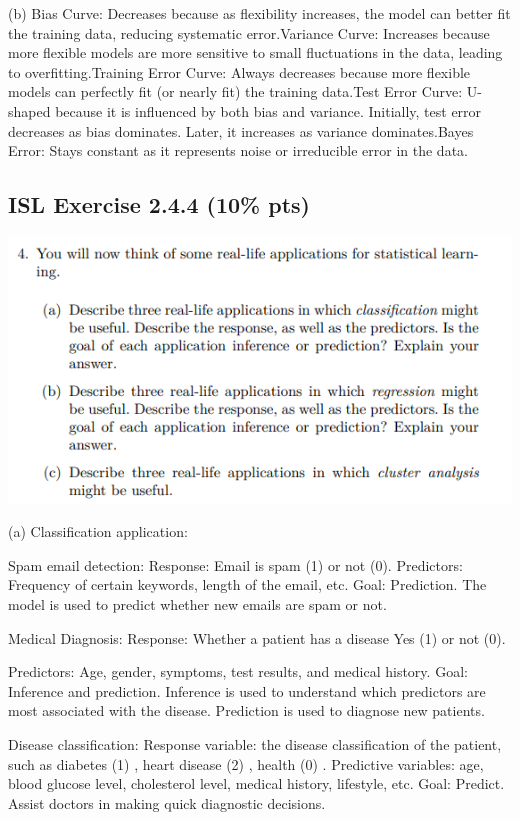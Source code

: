 \documentclass[
]{article}
\begin{document}
(b) Bias Curve: Decreases because as flexibility increases, the model
can better fit the training data, reducing systematic error.Variance
Curve: Increases because more flexible models are more sensitive to
small fluctuations in the data, leading to overfitting.Training Error
Curve: Always decreases because more flexible models can perfectly fit
(or nearly fit) the training data.Test Error Curve: U-shaped because it
is influenced by both bias and variance. Initially, test error decreases
as bias dominates. Later, it increases as variance dominates.Bayes
Error: Stays constant as it represents noise or irreducible error in the
data.

\hypertarget{isl-exercise-2.4.4-10-pts}{%
\subsection{ISL Exercise 2.4.4 (10\%
pts)}\label{isl-exercise-2.4.4-10-pts}}

\includegraphics{images/clipboard-1845645679.png}

(a) Classification application:

Spam email detection: Response: Email is spam (1) or not (0).
Predictors: Frequency of certain keywords, length of the email, etc.
Goal: Prediction. The model is used to predict whether new emails are
spam or not.

Medical Diagnosis: Response: Whether a patient has a disease Yes (1) or
not (0).

Predictors: Age, gender, symptoms, test results, and medical history.
Goal: Inference and prediction. Inference is used to understand which
predictors are most associated with the disease. Prediction is used to
diagnose new patients.

Disease classification: Response variable: the disease classification of
the patient, such as diabetes (1) , heart disease (2) , health (0) .
Predictive variables: age, blood glucose level, cholesterol level,
medical history, lifestyle, etc. Goal: Predict. Assist doctors in making
quick diagnostic decisions.
\end{document}
